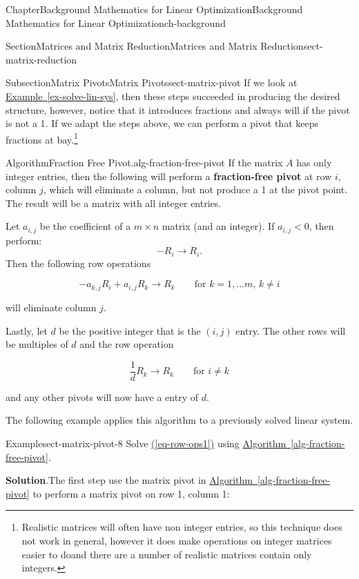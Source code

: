 \documentclass[oneside,10pt,]{book}
\newcommand{\blocktitlefont}{\relax}
\newcommand{\xreffont}{\relax}
\newcommand{\terminology}[1]{\textbf{#1}}
\numberwithin{equation}{section}
\newcommand{\lt}{<}
\begin{document}
\begin{chapterptx}{Chapter}{Background Mathematics for Linear Optimization}{}{Background Mathematics for Linear Optimization}{}{}{ch-background}
\begin{sectionptx}{Section}{Matrices and Matrix Reduction}{}{Matrices and Matrix Reduction}{}{}{sect-matrix-reduction}
\begin{subsectionptx}{Subsection}{Matrix Pivots}{}{Matrix Pivots}{}{}{sect-matrix-pivot}
If we look at \hyperref[ex-solve-lin-sys]{Example~{\xreffont\ref{ex-solve-lin-sys}}}, then these steps succeeded in producing the desired structure, however, notice that it introduces fractions and always will if the pivot is not a 1. If we adapt the steps above, we can perform a pivot that keeps fractions at bay.\footnote{Realistic matrices will often have non integer entries, so this technique does not work in general, however it does make operations on integer matrices easier to do\textemdash{}and there are a number of realistic matrices contain only integers.\label{sect-matrix-pivot-5-2}}%
\begin{algorithm}{Algorithm}{Fraction Free Pivot.}{}{alg-fraction-free-pivot}%
If the matrix \(A\) has only integer entries, then the following will perform a \terminology{fraction-free pivot} at row \(i\), column \(j\), which will eliminate a column, but not produce a 1 at the pivot point. The result will be a matrix with all integer entries.%
\par
Let \(a_{i,j}\) be the coefficient of a \(m \times n\) matrix (and an integer). If \(a_{i,j} \lt 0\), then perform:%
\begin{equation*}
- R_i \to R_i.
\end{equation*}
Then the following row operations%
\par
%
\begin{equation*}
-a_{k,j} R_i + a_{i,j} R_k \to R_k \qquad \text{for $k=1, \ldots m$, $k \neq i$}
\end{equation*}
%
\par
will eliminate column \(j\).%
\par
Lastly, let \(d\) be the positive integer that is the \((i,j)\) entry. The other rows will be multiples of \(d\) and the row operation%
\par
%
\begin{equation*}
\frac{1}{d} R_k \to R_k \qquad \text{for $i \neq k$}
\end{equation*}
%
\par
and any other pivots will now have a entry of \(d\).%
\end{algorithm}
The following example applies this algorithm to a previously solved linear system.%
\begin{example}{Example}{}{sect-matrix-pivot-8}%
Solve \hyperref[eq-row-ops1]{({\xreffont\ref{eq-row-ops1}})} using \hyperref[alg-fraction-free-pivot]{Algorithm~{\xreffont\ref{alg-fraction-free-pivot}}}.%
\par\smallskip%
\noindent\textbf{\blocktitlefont Solution}.\hypertarget{sect-matrix-pivot-8-2}{}\quad{}The first step use the matrix pivot in \hyperref[alg-fraction-free-pivot]{Algorithm~{\xreffont\ref{alg-fraction-free-pivot}}} to perform a matrix pivot on row 1, column 1:%

\end{example}
\end{subsectionptx}
\end{sectionptx}
\end{chapterptx}
\end{document}
